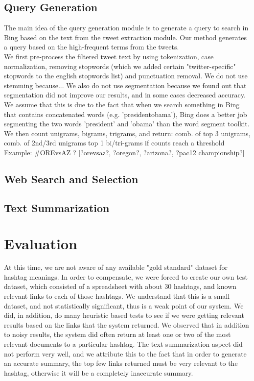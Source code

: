\documentclass{sig-alternate}
\begin{document}
\subsection{Query Generation}
The main idea of the query generation module is to generate a query to search in Bing based on the text from the tweet extraction module. Our method generates a query based on the high-frequent terms from the tweets.\\
We first pre-process the filtered tweet text by using tokenization, case normalization, removing stopwords (which we added certain "twitter-specific" stopwords to the english stopwords list) and punctuation removal. We do not use stemming because... We also do not use segmentation because we found out that segmentation did not improve our results, and in some cases decreased accuracy. We assume that this is due to the fact that when we search something in Bing that contains concatenated words (e.g. 'presidentobama'), Bing does a better job segmenting the two words 'president' and 'obama' than the word segment toolkit. \\
We then count unigrams, bigrams, trigrams, and return:
comb. of top 3 unigrams, comb. of 2nd/3rd unigrams
top 1 bi/tri-grams if counts reach a threshold
Example:
\#OREvsAZ  ? [?orevsaz?, ?oregon?, ?arizona?, ?pac12 championship?]

\subsection{Web Search and Selection}

\subsection{Text Summarization}



\section{Evaluation}
 At this time, we are not aware of any available "gold standard" dataset for hashtag meanings.  In order to compensate, we were forced to create our own test dataset, which consisted of a spreadsheet with about 30 hashtags, and known relevant links to each of those hashtags. We understand that this is a small dataset, and not statistically significant, thus is a weak point of our system. We did, in addition, do many heuristic based tests to see if we were getting relevant results based on the links that the system returned. We observed that in addition to noisy results, the system did often return at least one or two of the most relevant documents to a particular hashtag. The text summarization aspect did not perform very well, and we attribute this to the fact that in order to generate an accurate summary, the top few links returned must be very relevant to the hashtag, otherwise it will be a completely inaccurate summary.\\
\end{document}
